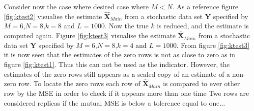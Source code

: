 Consider now the case where desired case where $M<N$. 
As a reference figure \ref{fig:ktest2} visualise the estimate $\hat{\textbf{X}}_{Main}$ from a stochastic data set $\textbf{Y}$ specified by $M=6$,$N=8$,$k=8$ and $L=1000$.  
Now the true $k$ is reduced, and the estimate is computed again.
Figure \ref{fig:ktest3} visualise the estimate $\hat{\textbf{X}}_{Main}$ from a stochastic data set $\textbf{Y}$ specified by $M=6$,$N=8$,$k=4$ and $L=1000$.
From figure \ref{fig:ktest3} it is now seen that the estimates of the zero rows is not as close to zero as in figure \ref{fig:ktest1}. Thus this can not be used as the indicator. However, the estimates of the zero rows still appears as a scaled copy of an estimate of a non-zero row. To locate the zero rows each row of $\hat{\textbf{X}}_{Main}$ is compared to ever other row by the MSE in order to check if it appears more than one time
Two rows are considered replicas if the mutual MSE is below a tolerence equal to one...

